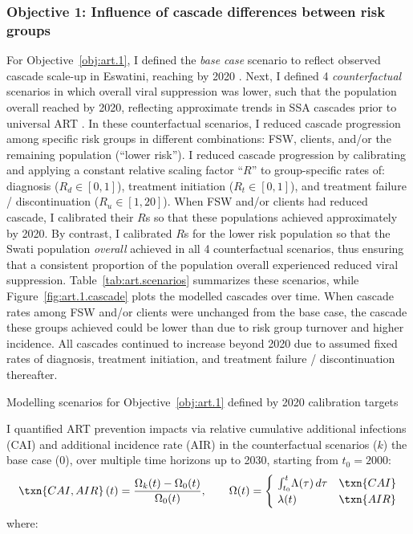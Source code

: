 \subsubsection{Objective 1: Influence of cascade differences between risk groups}\label{art.meth.obj.1}
For Objective~\ref{obj:art.1},
I defined the \emph{base case} scenario to reflect
observed cascade scale-up in Eswatini, reaching \cashi by 2020 \cite{AIDSinfo}.
Next, I defined 4 \emph{counterfactual} scenarios in which overall viral suppression was lower,
such that the population overall reached \casmd by 2020,
reflecting approximate trends in SSA cascades prior to universal ART \cite{AIDSinfo}.
In these counterfactual scenarios, I reduced cascade progression
among specific risk groups in different combinations:
FSW, clients, and/or the remaining population (``lower risk'').
I reduced cascade progression by calibrating and applying
a constant relative scaling factor ``$R$'' to group-specific rates of:
diagnosis ($R_d \in [0,1]$),
treatment initiation ($R_t \in [0,1]$), and
treatment failure / discontinuation ($R_u \in [1,20]$).
When FSW and/or clients had reduced cascade, I calibrated their $R$s so that
these populations achieved approximately \caslo by 2020.
By contrast, I calibrated $R$s for the lower risk population so that
the Swati population \emph{overall} achieved \casmd in all 4 counterfactual scenarios,
thus ensuring that a consistent proportion of the population overall
experienced reduced viral suppression.
Table~\ref{tab:art.scenarios} summarizes these scenarios, while
Figure~\ref{fig:art.1.cascade} plots the modelled cascades over time.
When cascade rates among FSW and/or clients were unchanged from the base case,
the cascade these groups achieved could be lower than \cashi
due to risk group turnover and higher incidence.
All cascades continued to increase beyond 2020 due to assumed fixed rates of
diagnosis, treatment initiation, and treatment failure / discontinuation thereafter.
\begin{table}
  \centering
  \caption{Modelling scenarios for Objective~\ref{obj:art.1} defined by 2020 calibration targets}
  \label{tab:art.scenarios}
  
\end{table}
\par
I quantified ART prevention impacts via relative
cumulative additional infections (CAI) and additional incidence rate (AIR)
in the counterfactual scenarios ($k$) \vs the base case ($0$),
over multiple time horizons up to 2030, starting from $t_0 = 2000$:
\begin{equation}
  \txn{CAI, AIR}\,(t) = \frac{\Omega_{k}(t) - \Omega_{0}(t)}{\Omega_{0}(t)}
  ,\qquad \Omega(t) =
  \begin{cases}
    ~\int_{t_0}^{t}\!\Lambda(\tau)\,d\tau & \txn{CAI} \\
    ~\lambda(t) & \txn{AIR}
  \end{cases}
\end{equation} where:
